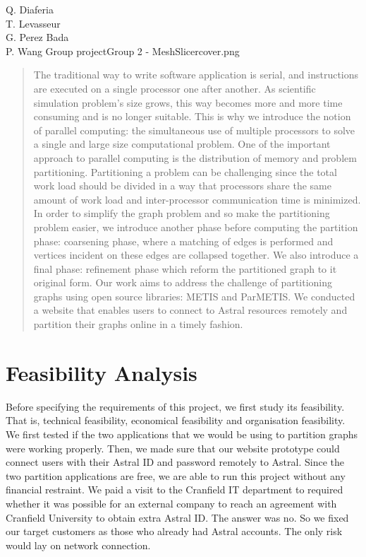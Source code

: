 \documentclass{cranfieldChart}
\begin{document}
{Q. Diaferia\\
T. Levasseur\\
G. Perez Bada\\
P. Wang
}{Group project}{Group 2 - MeshSlicer}{cover.png}

\newpage
\tableofcontents
\listoffigures
\newpage

\begin{abstract}
The traditional way to write software application is serial, and instructions are executed on a single processor one after another.
As scientific simulation problem's size grows, this way becomes more and more time consuming and is no longer suitable. This is why we introduce the notion of parallel computing: the simultaneous use of multiple processors to solve a single and large size computational problem. One of the important approach to parallel computing is the distribution of memory and problem partitioning. Partitioning a problem can be challenging since the total work load should be divided in a way that processors share the same amount of work load and inter-processor communication time is minimized. In order to simplify the graph problem and so make the partitioning problem easier, we introduce another phase before computing the partition phase: coarsening phase, where a matching of edges is performed and vertices incident on these edges are collapsed together. We also introduce a final phase: refinement phase which reform the partitioned graph to it original form. Our work aims to address the challenge of partitioning graphs using open source libraries: METIS and ParMETIS. We conducted a website that enables users to connect to Astral resources remotely and partition their graphs online in a timely fashion. 
\end{abstract}

\section{Feasibility Analysis} 
Before specifying the requirements of this project, we first study its feasibility. That is, technical feasibility, economical feasibility and organisation feasibility. We first tested if the two applications that we would be using to partition graphs were working properly. Then, we made sure that our website prototype could connect users with their Astral ID and password remotely to Astral. Since the two partition applications are free, we are able to run this project without any financial restraint. We paid a visit to the Cranfield IT department to required whether it was possible for an external company to reach an agreement with Cranfield University to obtain extra Astral ID. The answer was no. So we fixed our target customers as those who already had Astral accounts. The only risk would lay on network connection. 
\end{document}
